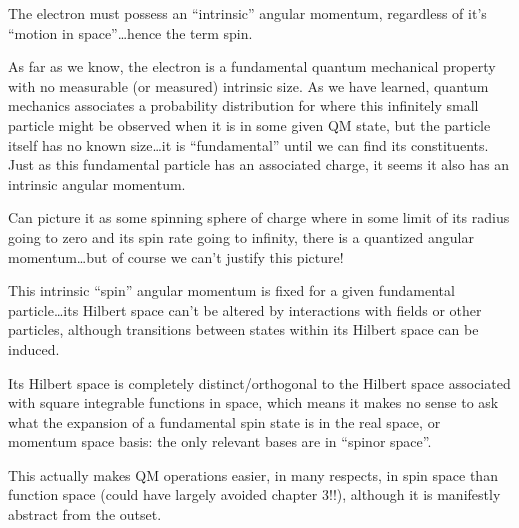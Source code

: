 \documentclass{article}
\begin{document}
The electron must possess an “intrinsic” angular momentum, regardless of it’s “motion in space”…hence the term spin.

As far as we know, the electron is a fundamental quantum mechanical property with no measurable (or measured) intrinsic size.  As we have learned, quantum mechanics associates a probability distribution for where this infinitely small particle might be observed when it is in some given QM state, but the particle itself has no known size…it is “fundamental” until we can find its constituents.  Just as this fundamental particle has an associated charge, it seems it also has an intrinsic angular momentum.

Can picture it as some spinning sphere of charge where in some limit of its radius going to zero and its spin rate going to infinity, there is a quantized angular momentum…but of course we can’t justify this picture!

This intrinsic “spin” angular momentum is fixed for a given fundamental particle…its Hilbert space can’t be altered by interactions with fields or other particles, although transitions between states within its Hilbert space can be induced.  

Its Hilbert space is completely distinct/orthogonal to the Hilbert space associated with square integrable functions in space, which means it makes no sense to ask what the expansion of a fundamental spin state is in the real space, or momentum space basis: the only relevant bases are in “spinor space”.

This actually makes QM operations easier, in many respects, in spin space than function space (could have largely avoided chapter 3!!), although it is manifestly abstract from the outset.
\end{document}
